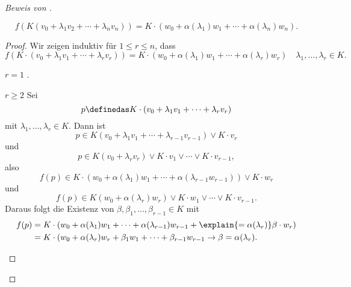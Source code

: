 \begin{proof}[Beweis von ]
\begin{lemma}
    \begin{equation*}
      f(K(v_0+\lambda_1 v_2+\dotsb+\lambda_n v_n))=K\cdot (w_0+\alpha(\lambda_1)w_1+\dotsb+\alpha(\lambda_n)w_n).
    \end{equation*}
  \end{lemma}
  \begin{proof}
    Wir zeigen induktiv für \( 1\leq r\leq n \), dass
    \begin{equation*}
      f(K\cdot (v_0+\lambda_1 v_1+\dotsb+\lambda_r v_r))=K\cdot (w_0+\alpha(\lambda_1)w_1+\dotsb+\alpha(\lambda_r)w_r)\quad \lambda_1,\dotsc,\lambda_r\in K.
    \end{equation*}
    \begin{proofdescription}
      \item[\( r=1 \)] \tto {} \checkmark.
      \item[\( r\geq 2 \)] Sei 
      \begin{equation*}
        p\definedas K\cdot (v_0+\lambda_1 v_1+\dotsb+\lambda_r v_r)
      \end{equation*}
      mit \( \lambda_1,\dotsc,\lambda_r\in K \). Dann ist
      \begin{equation*}
        p\in K(v_0+\lambda_1 v_1+\dotsb+\lambda_{r-1}v_{r-1})\vee K\cdot v_r
      \end{equation*}
      und
      \begin{equation*}
        p\in K(v_0+\lambda_r v_r)\vee K \cdot v_1\vee \dotsb\vee K\cdot v_{r-1},
      \end{equation*}
      also
      \begin{equation*}
        f(p)\in K\cdot (w_0+\alpha(\lambda_1)w_1+\dotsb+\alpha(\lambda_{r-1}w_{r-1}))\vee K\cdot w_r
      \end{equation*}
      und
      \begin{equation*}
        f(p)\in K(w_0+\alpha(\lambda_r)w_r)\vee K\cdot w_1\vee \dotsb\vee K\cdot v_{r-1}.
      \end{equation*}
      Daraus folgt die Existenz von \( \beta,\beta_1,\dotsc,\beta_{r-1}\in K \) mit 
      \begin{align*}
        f(p)&=K\cdot (w_0+\alpha(\lambda_1)w_1+\dotsb+\alpha(\lambda_{r-1})w_{r-1}+\explain{=\alpha(\lambda_r)}\beta\cdot w_r)\\
        &=K\cdot (w_0+\alpha(\lambda_r)w_r+\beta_1 w_1+\dotsb+\beta_{r-1}w_{r-1} \to \beta=\alpha(\lambda_r).
      \end{align*}
    \end{proofdescription}
    

\end{proof}
\end{proof}
